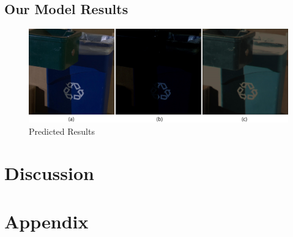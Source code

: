 \documentclass{article}
\begin{document}
\subsection{Our Model Results}

\begin{figure}[ht]
  \centering
  \includegraphics[scale=0.1]{trashcan_original_simmulated_and_our_result}
  \caption{ Predicted Results}
  \label{fig:train}
\end{figure}


\section{Discussion}


\section{Appendix}



\end{document}
